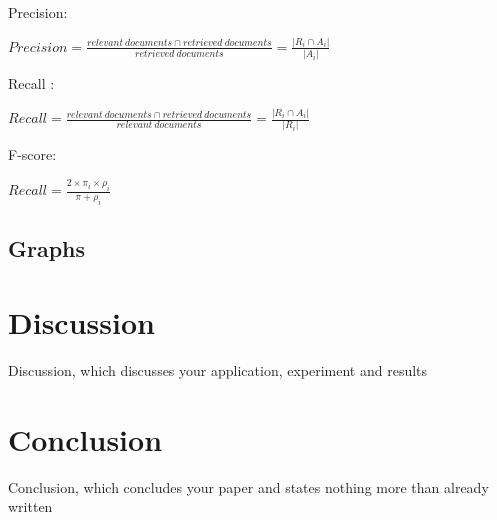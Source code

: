 \documentclass{article}
\begin{document}
    Precision: 
    \begin{center}
    $ Precision = \frac{relevant\ documents \cap retrieved\ documents}{retrieved\ documents} = \frac{|R_i \cap A_i|}{|A_i|} $ \\
    \end{center} 
    
    Recall : 
    \begin{center}
    $ Recall = \frac{relevant\ documents \cap retrieved\ documents}{relevant\ documents} = \frac{|R_i \cap A_i|}{|R_i|} $ \\
    \end{center} 
    
    F-score:
    \begin{center}
    $ Recall = \frac{2 \times \pi_i \times \rho_i}{\pi + \rho_i} $\\
    \end{center} 

\subsection{Graphs}

\section{Discussion}
Discussion, which discusses your application, experiment and results

\section{Conclusion}
Conclusion, which concludes your paper and states nothing more than already
written

 
 
\end{document}
